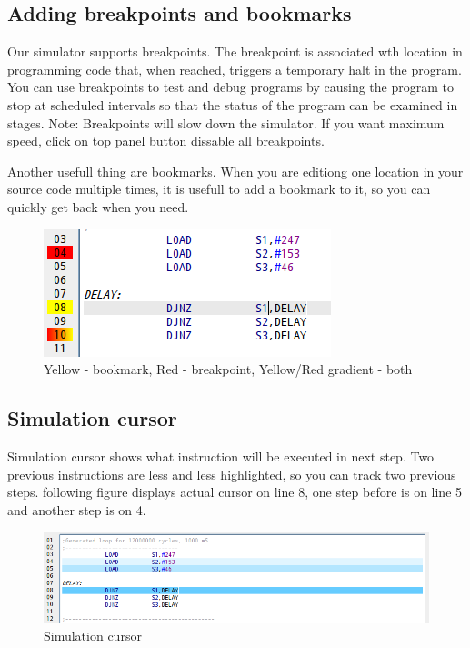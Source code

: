     \subsection{Adding breakpoints and bookmarks}
        Our simulator supports breakpoints. The breakpoint is associated wth location in programming code that, when reached, triggers a temporary halt in the program.
        You can use breakpoints to test and debug programs by causing the program to stop at scheduled intervals so that the status of
        the program can be examined in stages. Note: Breakpoints will slow down the simulator. If you want maximum speed, click on top panel
        button dissable all breakpoints.

        Another usefull thing are bookmarks. When you are editiong one location in your source code multiple times, it is usefull to add a bookmark to it,
        so you can quickly get back when you need.

        \begin{figure}[h!]
            \centering
            \includegraphics[width=.4\textwidth]{img/breakpoints1.png}
            \caption{Yellow - bookmark, Red - breakpoint, Yellow/Red gradient - both}
        \end{figure}

    \subsection{Simulation cursor}
        Simulation cursor shows what instruction will be executed in next step. Two previous instructions are less and less highlighted, so you can track
        two previous steps. following figure displays actual cursor on line 8, one step before is on line 5 and another step is on 4.
        \begin{figure}[h!]
            \centering
            \includegraphics[width=\textwidth]{img/simulationcursor1.png}
            \caption{Simulation cursor}
        \end{figure}

